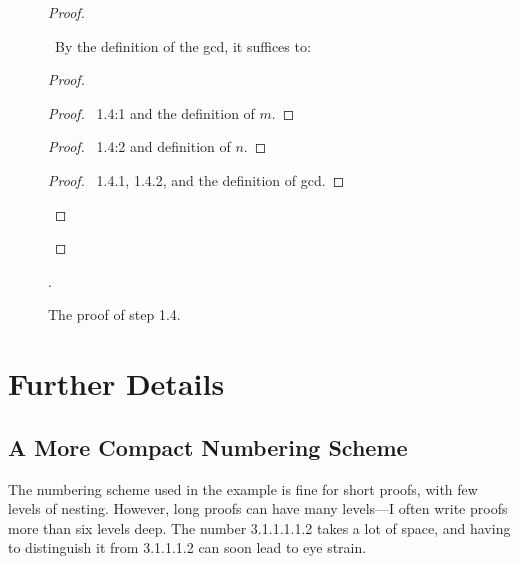 \begin{figure}
\small
\begin{proof}
\begin{noproof}
\pf\ By the definition of the gcd, it suffices
to:
\begin{proof}
    \begin{proof}
      \pf\ 1.4:1 and the definition of $m$.
    \end{proof}
    \begin{proof}
      \pf\ 1.4:2 and definition of $n$.
    \end{proof}
  \qedstep
    \begin{proof}
      \pf\ 1.4.1, 1.4.2, and the definition of gcd.
    \end{proof}
\end{proof}
\end{noproof}
\end{proof}
\normalsize
\caption{The proof of step 1.4.}
\label{fig:step1.4}.
\end{figure}
\section{Further Details}

\subsection{A More Compact Numbering Scheme} 
\pflongindent

The numbering scheme used in the example is fine for short proofs,
with few levels of nesting.  However, long proofs can have many
levels---I often write proofs more than six levels deep.  The number
3.1.1.1.1.2 takes a lot of space, and having to distinguish it from
3.1.1.1.2 can soon lead to eye strain.


